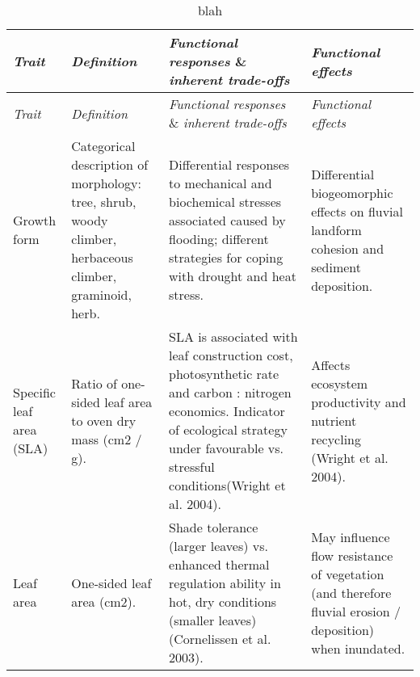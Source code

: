 \documentclass[12pt,a4paper]{memoir}
\begin{document}
\doublespacing



\pagestyle{empty}
\begin{landscape}
\begin{tiny}
{\tabulinesep=1.2mm
\begin{longtabu} to  
\caption{blah} \\
\toprule
\textit{Trait} & \textit{Definition} & \textit{Functional responses} \& \textit{inherent trade-offs} & \textit{Functional effects} \\ \hline
%
\endfirsthead
%
%
\toprule
\textit{Trait} & \textit{Definition} & \textit{Functional responses} \& \textit{inherent trade-offs} & \textit{Functional effects} \\ \hline
\endhead
%
%
\hline
Growth form & Categorical description of morphology: tree, shrub, woody climber, herbaceous climber, graminoid, herb. & Differential responses to mechanical and biochemical stresses associated caused by flooding; different strategies for coping with drought and heat stress. & Differential biogeomorphic effects on fluvial landform cohesion and sediment deposition. \\ \hline
Specific leaf area (SLA) & Ratio of one-sided leaf area to oven dry mass (cm2 / g). & SLA is associated with leaf construction cost, photosynthetic rate and carbon : nitrogen economics. Indicator of  ecological strategy under favourable vs. stressful conditions(Wright et al. 2004). & Affects ecosystem productivity and nutrient recycling (Wright et al. 2004). \\ \hline
Leaf area & One-sided leaf area (cm2). & Shade tolerance (larger leaves) vs. enhanced thermal regulation ability in hot, dry conditions (smaller leaves) (Cornelissen et al. 2003). & May influence flow resistance of vegetation (and therefore fluvial erosion / deposition) when inundated. \\ \hline

\end{longtabu}}
\end{tiny}
\end{landscape}
\end{document}
